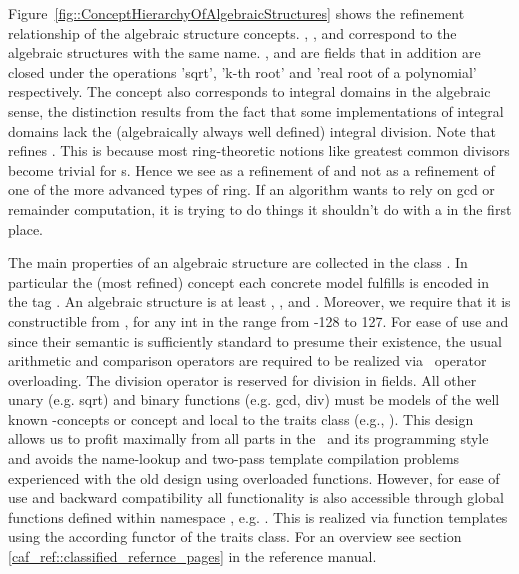 Figure~\ref{fig::ConceptHierarchyOfAlgebraicStructures} shows the refinement 
relationship of the algebraic structure concepts. 
, ,   and 
 correspond to the algebraic structures with the
same name. ,  and 
 are fields that in addition are closed under 
the operations 'sqrt', 'k-th root' and 'real root of a polynomial' 
respectively. The concept  also
corresponds to integral domains in the algebraic sense, the
distinction results from the fact that some implementations of
integral domains lack the (algebraically always well defined) integral 
division.
Note that  refines . This is because 
most ring-theoretic notions like greatest common divisors become trivial for 
s. Hence we see  as a refinement of 
 and not as a 
refinement of one of the more advanced types of ring. 
If an algorithm wants to rely on gcd or remainder computation, it is trying 
to do things it shouldn't do with a  in the first place. 


The main properties of an algebraic structure are collected in the class   
. 
In particular the (most refined) concept each concrete model  
fulfills is encoded in the tag 
.
An algebraic structure is at least , 
,  and 
. Moreover, we require that it is
constructible from , for any int in the range from -128 to 127. 
For ease of use and since their semantic is sufficiently standard to presume 
their existence, the usual arithmetic and comparison operators are required
to be realized via \CC\ operator overloading. 
The division operator is reserved for division in fields.  
All other unary (e.g. sqrt) and binary functions 
(e.g. gcd, div) must be models of the well known \stl-concepts
 or 
concept and local to the traits class 
(e.g., ). 
This design allows us to profit maximally from all parts in the 
\stl\ and its programming style and avoids the name-lookup and 
two-pass template compilation problems experienced with the old design 
using overloaded functions. However, for ease of use and backward 
compatibility all functionality is also 
accessible through global functions defined within namespace , 
e.g. . This is realized via function templates using 
the according functor of the traits class. For an overview see section  
\ref{caf_ref::classified_refernce_pages} in the reference manual.

